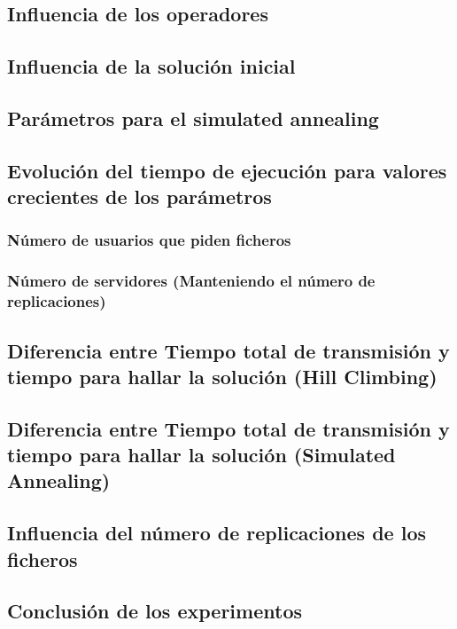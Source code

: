     \subsection{Influencia de los operadores}
    
    \subsection{Influencia de la solución inicial}
    
    \subsection{Parámetros para el simulated annealing}
    
    \subsection{Evolución del tiempo de ejecución para valores crecientes de los parámetros}
    
    \subsubsection{Número de usuarios que piden ficheros}
    
    \subsubsection{Número de servidores (Manteniendo el número de replicaciones)}
    
    \subsection{Diferencia entre Tiempo total de transmisión y tiempo para hallar la solución (Hill Climbing)}
    
    \subsection{Diferencia entre Tiempo total de transmisión y tiempo para hallar la solución (Simulated Annealing)}
    
    \subsection{Influencia del número de replicaciones de los ficheros}
    
    \subsection{Conclusión de los experimentos}
    
    
    
